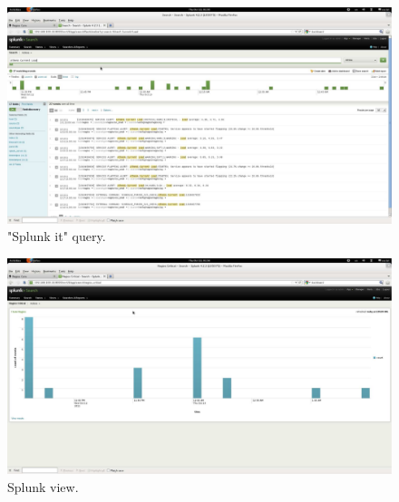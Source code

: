 \documentclass[10pt,a4paper,final]{report}
\begin{document}
\begin{figure}[hbpt]
\begin{center}
\includegraphics[width=\linewidth]{Nagios_splunk_it.pdf}
\end{center}
\caption{"Splunk it" query.}
\label{SplunkIt}
\end{figure}
\begin{figure}[hbpt]
\begin{center}
\includegraphics[width=\linewidth]{Nagios_Critical.pdf}
\end{center}
\caption{Splunk view.}
\label{report}
\end{figure}
\newpage
\appendix
\end{document}
